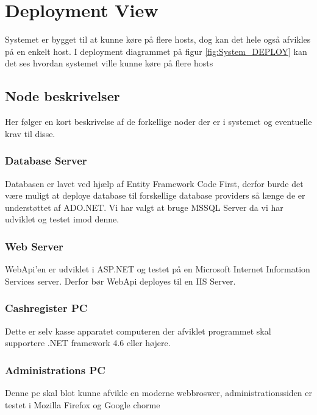 \section{Deployment View}
Systemet er bygget til at kunne køre på flere hosts, dog kan det hele også afvikles på en enkelt host. 
I deployment diagrammet på figur \ref{fig:System_DEPLOY} kan det ses hvordan systemet ville kunne køre på flere hosts


\subsection{Node beskrivelser}
Her følger en kort beskrivelse af de forkellige noder der er i systemet og eventuelle krav til disse.

\subsubsection{Database Server}
Databasen er lavet ved hjælp af Entity Framework Code First, derfor burde det være muligt at deploye database til forskellige database providers så længe de er understøttet af ADO.NET.
Vi har valgt at bruge MSSQL Server da vi har udviklet og testet imod denne.

\subsubsection{Web Server}
WebApi'en er udviklet i ASP.NET og testet på en Microsoft Internet Information Services server. 
Derfor bør WebApi deployes til en IIS Server.

\subsubsection{Cashregister PC}
Dette er selv kasse apparatet computeren der afviklet programmet skal supportere .NET framework 4.6 eller højere.

\subsubsection{Administrations PC}
Denne pc skal blot kunne afvikle en moderne webbroswer, administrationssiden er testet i Mozilla Firefox og Google chorme